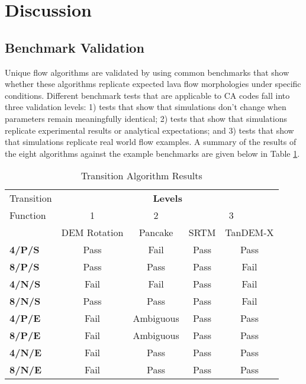 
\section{Discussion}\label{sec:discussion}
	\subsection{Benchmark Validation}
	Unique flow algorithms are validated by using common benchmarks that show whether these algorithms replicate expected lava flow morphologies under specific conditions. Different benchmark tests that are applicable to CA codes fall into three validation levels: 1) tests that show that simulations don't change when parameters remain meaningfully identical; 2) tests that show that simulations replicate experimental results or analytical expectations; and 3) tests that show that simulations replicate real world flow examples. A summary of the results of the eight algorithms against the example benchmarks are given below in Table \ref{tab_algorithmresults}.
		
	\begin{table}[h]
		\centering
		\caption{Transition Algorithm Results}
		\begin{tabular}{l | c | c | c c}
			\toprule
			Transition&\multicolumn{4}{c}{\textbf{Levels}}\\
			Function&1&2&\multicolumn{2}{c}{3}\\
			& DEM Rotation & Pancake & SRTM & TanDEM-X \\
			\midrule
			\textbf{4/P/S} & Pass & Fail & Pass & Pass\\
			\textbf{8/P/S} & Pass & Pass & Pass & Fail\\
			\textbf{4/N/S} & Fail & Fail & Pass & Fail\\
			\textbf{8/N/S} & Pass & Pass& Pass & Fail\\
			\textbf{4/P/E} & Fail & Ambiguous & Pass & Pass\\
			\textbf{8/P/E} & Fail & Ambiguous & Pass & Pass\\
			\textbf{4/N/E} & Fail & Pass & Pass & Pass\\
			\textbf{8/N/E} & Fail & Pass & Pass & Pass\\
			
			\bottomrule
		\end{tabular}
		\label{tab_algorithmresults}
	\end{table}
	
